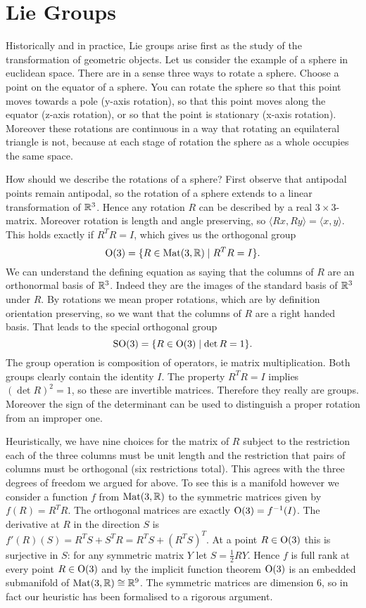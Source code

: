 \section{Lie Groups}

Historically and in practice, Lie groups arise first as the study of the transformation of geometric objects.
Let us consider the example of a sphere in euclidean space.
There are in a sense three ways to rotate a sphere.
Choose a point on the equator of a sphere.
You can rotate the sphere so that this point moves towards a pole (y-axis rotation), so that this point moves along the equator (z-axis rotation), or so that the point is stationary (x-axis rotation).
Moreover these rotations are continuous in a way that rotating an equilateral triangle is not, because at each stage of rotation the sphere as a whole occupies the same space.

How should we describe the rotations of a sphere?
First observe that antipodal points remain antipodal, so the rotation of a sphere extends to a linear transformation of $\mathbb{R}^3$.
Hence any rotation $R$ can be described by a real $3\times 3$-matrix.
Moreover rotation is length and angle preserving, so $\langle Rx, Ry \rangle = \langle x, y \rangle$.
This holds exactly if $R^TR = I$, which gives us the orthogonal group
\[
\mathrm{O}(3) = \{ R \in \operatorname{Mat}(3,\mathbb{R}) \mid R^TR = I \}.
\]
We can understand the defining equation as saying that the columns of $R$ are an orthonormal basis of $\mathbb{R}^3$.
Indeed they are the images of the standard basis of $\mathbb{R}^3$ under $R$.
By rotations we mean proper rotations, which are by definition orientation preserving, so we want that the columns of $R$ are a right handed basis.
That leads to the special orthogonal group
\[
\mathrm{SO}(3) = \{ R \in \mathrm{O}(3) \mid \det R = 1 \}.
\]
The group operation is composition of operators, ie matrix multiplication.
Both groups clearly contain the identity $I$.
The property $R^T R = I$ implies $(\det R)^2 = 1$, so these are invertible matrices.
Therefore they really are groups.
Moreover the sign of the determinant can be used to distinguish a proper rotation from an improper one.

Heuristically, we have nine choices for the matrix of $R$ subject to the restriction each of the three columns must be unit length and the restriction that pairs of columns must be orthogonal (six restrictions total).
This agrees with the three degrees of freedom we argued for above.
To see this is a manifold however we consider a function $f$ from $\operatorname{Mat}(3,\mathbb{R})$ to the symmetric matrices given by $f(R) = R^TR$.
The orthogonal matrices are exactly $\mathrm{O}(3) = f^{-1}(I)$.
The derivative at $R$ in the direction $S$ is $f'(R)(S) = R^TS + S^T R = R^T S + (R^T S)^T$.
At a point $R \in \mathrm{O}(3)$ this is surjective in $S$: for any symmetric matrix $Y$ let $S = \frac{1}{2}RY$.
Hence $f$ is full rank at every point $R \in \mathrm{O}(3)$ and by the implicit function theorem $\mathrm{O}(3)$ is an embedded submanifold of $\operatorname{Mat}(3,\mathbb{R}) \cong \mathbb{R}^9$.
The symmetric matrices are dimension $6$, so in fact our heuristic has been formalised to a rigorous argument.

